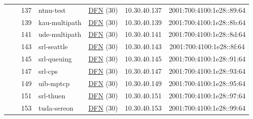 \begin{small}
\begin{center}
\begin{longtable}{|c|c|c|c|c|c|c|c|}
  &  & \tiny{137} & \multicolumn{1}{|l|}{\tiny{ntnu-test}} & \multicolumn{2}{|c|}{\tiny{\href{https://www.dfn.de}{DFN} (30)}} & \tiny{10.30.40.137} & \tiny{2001:700:4100:1e28::89:64} \\* \cline{3-3}\cline{4-4}\cline{5-5}\cline{6-6}\cline{7-7}\cline{8-8}
  &  & \tiny{139} & \multicolumn{1}{|l|}{\tiny{kau-multipath}} & \multicolumn{2}{|c|}{\tiny{\href{https://www.dfn.de}{DFN} (30)}} & \tiny{10.30.40.139} & \tiny{2001:700:4100:1e28::8b:64} \\* \cline{3-3}\cline{4-4}\cline{5-5}\cline{6-6}\cline{7-7}\cline{8-8}
  &  & \tiny{141} & \multicolumn{1}{|l|}{\tiny{ude-multipath}} & \multicolumn{2}{|c|}{\tiny{\href{https://www.dfn.de}{DFN} (30)}} & \tiny{10.30.40.141} & \tiny{2001:700:4100:1e28::8d:64} \\* \cline{3-3}\cline{4-4}\cline{5-5}\cline{6-6}\cline{7-7}\cline{8-8}
  &  & \tiny{143} & \multicolumn{1}{|l|}{\tiny{srl-seattle}} & \multicolumn{2}{|c|}{\tiny{\href{https://www.dfn.de}{DFN} (30)}} & \tiny{10.30.40.143} & \tiny{2001:700:4100:1e28::8f:64} \\* \cline{3-3}\cline{4-4}\cline{5-5}\cline{6-6}\cline{7-7}\cline{8-8}
  &  & \tiny{145} & \multicolumn{1}{|l|}{\tiny{srl-queuing}} & \multicolumn{2}{|c|}{\tiny{\href{https://www.dfn.de}{DFN} (30)}} & \tiny{10.30.40.145} & \tiny{2001:700:4100:1e28::91:64} \\* \cline{3-3}\cline{4-4}\cline{5-5}\cline{6-6}\cline{7-7}\cline{8-8}
  &  & \tiny{147} & \multicolumn{1}{|l|}{\tiny{srl-cps}} & \multicolumn{2}{|c|}{\tiny{\href{https://www.dfn.de}{DFN} (30)}} & \tiny{10.30.40.147} & \tiny{2001:700:4100:1e28::93:64} \\* \cline{3-3}\cline{4-4}\cline{5-5}\cline{6-6}\cline{7-7}\cline{8-8}
  &  & \tiny{149} & \multicolumn{1}{|l|}{\tiny{uib-mptcp}} & \multicolumn{2}{|c|}{\tiny{\href{https://www.dfn.de}{DFN} (30)}} & \tiny{10.30.40.149} & \tiny{2001:700:4100:1e28::95:64} \\* \cline{3-3}\cline{4-4}\cline{5-5}\cline{6-6}\cline{7-7}\cline{8-8}
  &  & \tiny{151} & \multicolumn{1}{|l|}{\tiny{srl-thuen}} & \multicolumn{2}{|c|}{\tiny{\href{https://www.dfn.de}{DFN} (30)}} & \tiny{10.30.40.151} & \tiny{2001:700:4100:1e28::97:64} \\* \cline{3-3}\cline{4-4}\cline{5-5}\cline{6-6}\cline{7-7}\cline{8-8}
  &  & \tiny{153} & \multicolumn{1}{|l|}{\tiny{tuda-sereon}} & \multicolumn{2}{|c|}{\tiny{\href{https://www.dfn.de}{DFN} (30)}} & \tiny{10.30.40.153} & \tiny{2001:700:4100:1e28::99:64} \\* \cline{3-3}\cline{4-4}\cline{5-5}\cline{6-6}\cline{7-7}\cline{8-8}

\end{longtable}
\end{center}
\end{small}

